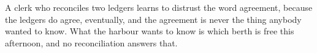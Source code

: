 \documentclass{article}
\begin{document}
A clerk who reconciles two ledgers learns to distrust the word agreement,
because the ledgers do agree, eventually, and the agreement is never the
thing anybody wanted to know. What the harbour wants to know is which berth
is free this afternoon, and no reconciliation answers that.
\end{document}
